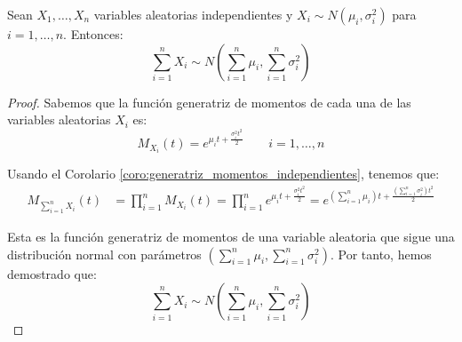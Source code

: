 \begin{prop}
    Sean $X_1, \dots, X_n$ variables aleatorias independientes y $X_i\sim N(\mu_i, \sigma_i^2)$ para $i=1,\dots,n$. Entonces:
    \begin{equation*}
        \sum_{i=1}^{n}X_i \sim N\left(\sum_{i=1}^{n}\mu_i, \sum_{i=1}^{n}\sigma_i^2\right)
    \end{equation*}

    \begin{proof}
        Sabemos que la función generatriz de momentos de cada una de las variables aleatorias $X_i$ es:
        \begin{equation*}
            M_{X_i}(t) = e^{\mu_i t + \frac{\sigma_i^2 t^2}{2}} \qquad i=1,\dots,n
        \end{equation*}

        Usando el Corolario \ref{coro:generatriz_momentos_independientes}, tenemos que:
        \begin{align*}
            M_{\sum\limits_{i=1}^{n}X_i}(t) &= \prod_{i=1}^{n}M_{X_i}(t) = \prod_{i=1}^{n}e^{\mu_i t + \frac{\sigma_i^2 t^2}{2}} = e^{\left(\sum\limits_{i=1}^{n}\mu_i\right)t + \frac{\left(\sum\limits_{i=1}^{n}\sigma_i^2\right)t^2}{2}}
        \end{align*}

        Esta es la función generatriz de momentos de una variable aleatoria que sigue una distribución normal con parámetros $\left(\sum\limits_{i=1}^{n}\mu_i, \sum\limits_{i=1}^{n}\sigma_i^2\right)$. Por tanto, hemos demostrado que:
        \begin{equation*}
            \sum_{i=1}^{n}X_i \sim N\left(\sum_{i=1}^{n}\mu_i, \sum_{i=1}^{n}\sigma_i
            ^2\right)
        \end{equation*}
    \end{proof}
\end{prop}

